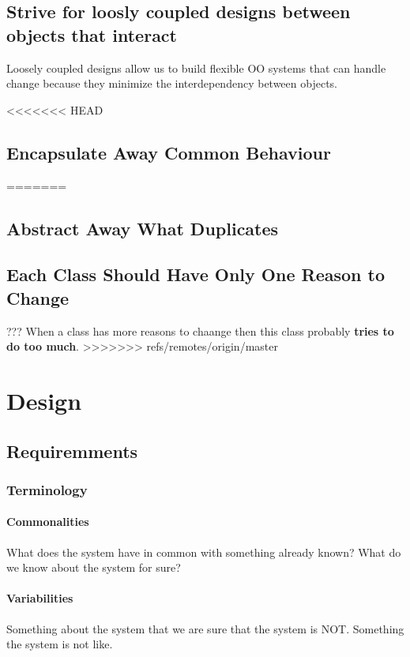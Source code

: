 \documentclass{report}
\begin{document}
\chapter{Strive for loosly coupled designs between objects that interact}
Loosely coupled designs allow us to build flexible OO systems that can handle change 
because they minimize the interdependency between objects.



<<<<<<< HEAD
\chapter{Encapsulate Away Common Behaviour}
=======
\chapter{Abstract Away What Duplicates}



\chapter{Each Class Should Have Only One Reason to Change}
??? When a class has more reasons to chaange then this class probably
\textbf{tries to do too much}.
>>>>>>> refs/remotes/origin/master




\part{Design}



\chapter{Requiremments}


\section{Terminology}

\subsection{Commonalities}
What does the system have in common with something already known?
What do we know about the system for sure?

\subsection{Variabilities}
Something about the system that we are sure that the system is NOT. 
Something the system is not like.
\end{document}
